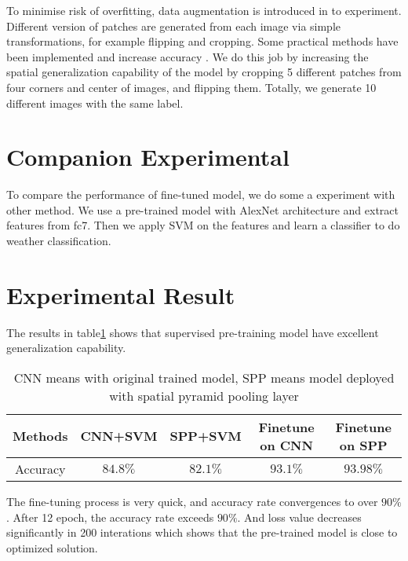 To minimise risk of overfitting, data augmentation is introduced in to experiment. Different version of patches are generated from each image via simple transformations, for example flipping and cropping. Some practical methods have been implemented and increase accuracy \citep{krizhevsky2012imagenet}. We do this job by increasing the spatial generalization capability of the model  by cropping 5 different patches from four corners and center of images, and flipping them. Totally, we generate 10 different images with the same label.

\section{Companion Experimental}

To compare the performance of fine-tuned model, we do some a experiment with other method. We use a pre-trained model with AlexNet architecture and extract features from fc7. Then we apply SVM on the features and learn a classifier to do weather classification.

\section{Experimental Result}

The results in table\ref{ExpRes} shows that supervised pre-training model have excellent generalization capability. 

\begin{table}[h]
\begin{center}
    \begin{tabular}{| c | c | c | c | c |}
    \hline
    Methods & CNN+SVM & SPP+SVM & Finetune on CNN & Finetune on SPP  \\ \hline
    Accuracy & $84.8\%$ & $82.1\%$ & $93.1\%$ & $93.98\%$ \\ \hline
    \end{tabular}
    \caption{CNN means with original trained model, SPP means model deployed with spatial pyramid pooling layer}
    \label{ExpRes}
\end{center}
\end{table}

The fine-tuning process is very quick, and accuracy rate convergences to over $90\%$. 
After 12 epoch, the accuracy rate exceeds $90\%$. And loss value decreases significantly in 200 interations which shows that the pre-trained model is close to optimized solution. 


